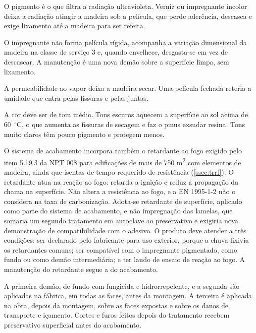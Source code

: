 \begin{alineas}
    \item O pigmento é o que filtra a radiação ultravioleta. Verniz ou
          impregnante incolor deixa a radiação atingir a madeira sob a película,
          que perde aderência, descasca e exige lixamento até a madeira para ser
          refeita.
    \item O impregnante não forma película rígida, acompanha a variação
          dimensional da madeira na classe de serviço 3 e, quando envelhece,
          desgasta-se em vez de descascar. A manutenção é uma nova demão sobre a
          superfície limpa, sem lixamento.
    \item A permeabilidade ao vapor deixa a madeira secar. Uma película fechada
          reteria a umidade que entra pelas fissuras e pelas juntas.
\end{alineas}

A cor deve ser de tom médio. Tons escuros aquecem a superfície ao sol acima de
60~$^{\circ}$C, o que aumenta as fissuras de secagem e faz o pinus exsudar resina.
Tons muito claros têm pouco pigmento e protegem menos.

O sistema de acabamento incorpora também o retardante ao fogo exigido pelo item
5.19.3 da NPT 008 \cite{CBMPR-NPT008:2026} para edificações de mais de 750
m\textsuperscript{2} com elementos de madeira, ainda que isentas de tempo requerido
de resistência (\autoref{ssec:trrf}). O retardante atua na reação ao fogo: retarda
a ignição e reduz a propagação da chama na superfície. Não altera a resistência
ao fogo, e a EN 1995-1-2 \cite{EN1995-1-2:2004} não o considera na taxa de
carbonização. Adota-se retardante de superfície, aplicado como parte do sistema
de acabamento, e não impregnação das lamelas, que somaria um segundo tratamento
em autoclave ao preservativo e exigiria nova demonstração de compatibilidade com o
adesivo. O produto deve atender a três condições: ser declarado pelo fabricante
para uso exterior, porque a chuva lixivia os retardantes comuns; ser compatível
com o impregnante pigmentado, como fundo ou como demão intermediária; e ter laudo
de ensaio de reação ao fogo. A manutenção do retardante segue a do acabamento.


A primeira demão, de fundo com fungicida e hidrorrepelente, e a segunda são
aplicadas na fábrica, em todas as faces, antes da montagem. A terceira é aplicada
na obra, depois da montagem, sobre as faces expostas e sobre os danos de
transporte e içamento. Cortes e furos feitos depois do tratamento recebem
preservativo superficial antes do acabamento.

